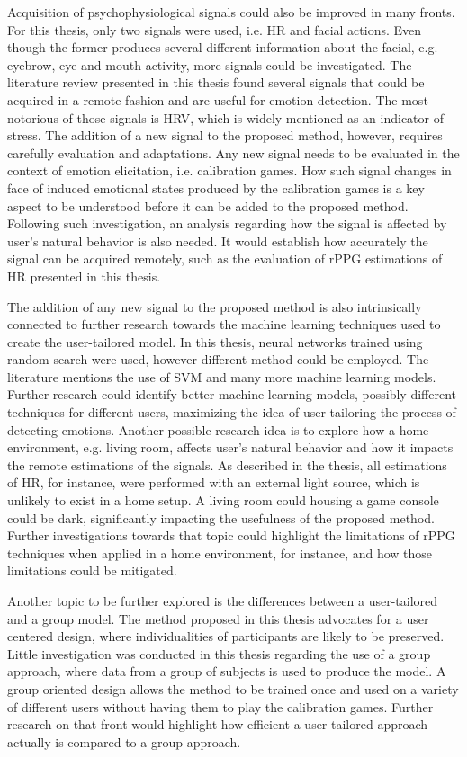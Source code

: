 Acquisition of psychophysiological signals could also be improved in many fronts. For this thesis, only two signals were used, i.e. HR and facial actions. Even though the former produces several different information about the facial, e.g. eyebrow, eye and mouth activity, more signals could be investigated. The literature review presented in this thesis found several signals that could be acquired in a remote fashion and are useful for emotion detection. The most notorious of those signals is HRV, which is widely mentioned as an indicator of stress. The addition of a new signal to the proposed method, however, requires carefully evaluation  and adaptations. Any new signal needs to be evaluated in the context of emotion elicitation, i.e. calibration games. How such signal changes in face of induced emotional states produced by the calibration games is a key aspect to be understood before it can be added to the proposed method. Following such investigation, an analysis regarding how the signal is affected by user's natural behavior is also needed. It would establish how accurately the signal can be acquired remotely, such as the evaluation of rPPG estimations of HR presented in this thesis.

The addition of any new signal to the proposed method is also intrinsically connected to further research towards the machine learning techniques used to create the user-tailored model. In this thesis, neural networks trained using random search were used, however different method could be employed. The literature mentions the use of SVM and many more machine learning models. Further research could identify better machine learning models, possibly different techniques for different users, maximizing the idea of user-tailoring the process of detecting emotions. Another possible research idea is to explore how a home environment, e.g. living room, affects user's natural behavior and how it impacts the remote estimations of the signals. As described in the thesis, all estimations of HR, for instance, were performed with an external light source, which is unlikely to exist in a home setup. A living room could housing a game console could be dark, significantly impacting the usefulness of the proposed method. Further investigations towards that topic could highlight the limitations of rPPG techniques when applied in a home environment, for instance, and how those limitations could be mitigated.

Another topic to be further explored is the differences between a user-tailored and a group model. The method proposed in this thesis advocates for a user centered design, where individualities of participants are likely to be preserved. Little investigation was conducted in this thesis regarding the use of a group approach, where data from a group of subjects is used to produce the model. A group oriented design allows the method to be trained once and used on a variety of different users without having them to play the calibration games. Further research on that front would highlight how efficient a user-tailored approach actually is compared to a group approach.

